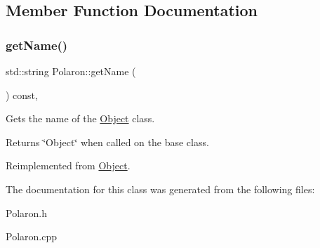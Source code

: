 \subsection{Member Function Documentation}
\mbox{\label{class_polaron_ab30575f6248183c9dab4d257df2f91fc}} 
\subsubsection{\texorpdfstring{get\+Name()}{getName()}}
{\footnotesize\ttfamily std\+::string Polaron\+::get\+Name (\begin{DoxyParamCaption}{ }\end{DoxyParamCaption}) const\hspace{0.3cm}{\ttfamily [inline]}, {\ttfamily [virtual]}}



Gets the name of the \hyperlink{class_object}{Object} class. 

\begin{DoxyReturn}{Returns}
\char`\"{}\+Object\char`\"{} when called on the base class. 
\end{DoxyReturn}


Reimplemented from \hyperlink{class_object_ade517616d51cd9ab581ec5afeb37b313}{Object}.



The documentation for this class was generated from the following files\+:\begin{DoxyCompactItemize}
\item 
Polaron.\+h\item 
Polaron.\+cpp\end{DoxyCompactItemize}
